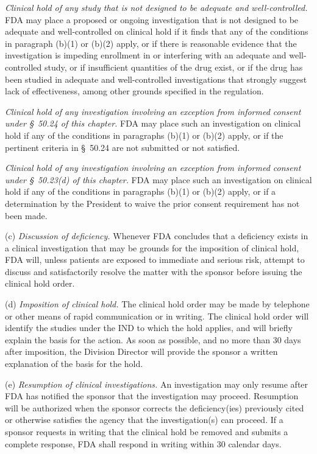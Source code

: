 \begin{description}[leftmargin=0.5cm,style=sameline]
\item[(4)] \textit{Clinical hold of any study that is not designed to be adequate and well-controlled.} FDA may place a proposed or ongoing investigation that is not designed to be adequate and well-controlled on clinical hold if it finds that any of the conditions in paragraph (b)(1) or (b)(2) apply, or if there is reasonable evidence that the investigation is impeding enrollment in or interfering with an adequate and well-controlled study, or if insufficient quantities of the drug exist, or if the drug has been studied in adequate and well-controlled investigations that strongly suggest lack of effectiveness, among other grounds specified in the regulation.

\item[(5)] \textit{Clinical hold of any investigation involving an exception from informed consent under \S~50.24 of this chapter.} FDA may place such an investigation on clinical hold if any of the conditions in paragraphs (b)(1) or (b)(2) apply, or if the pertinent criteria in \S~50.24 are not submitted or not satisfied.

\item[(6)] \textit{Clinical hold of any investigation involving an exception from informed consent under \S~50.23(d) of this chapter.} FDA may place such an investigation on clinical hold if any of the conditions in paragraphs (b)(1) or (b)(2) apply, or if a determination by the President to waive the prior consent requirement has not been made.
\end{description}

(c) \textit{Discussion of deficiency.} Whenever FDA concludes that a deficiency exists in a clinical investigation that may be grounds for the imposition of clinical hold, FDA will, unless patients are exposed to immediate and serious risk, attempt to discuss and satisfactorily resolve the matter with the sponsor before issuing the clinical hold order.

(d) \textit{Imposition of clinical hold.} The clinical hold order may be made by telephone or other means of rapid communication or in writing. The clinical hold order will identify the studies under the IND to which the hold applies, and will briefly explain the basis for the action. As soon as possible, and no more than 30 days after imposition, the Division Director will provide the sponsor a written explanation of the basis for the hold.

(e) \textit{Resumption of clinical investigations.} An investigation may only resume after FDA has notified the sponsor that the investigation may proceed. Resumption will be authorized when the sponsor corrects the deficiency(ies) previously cited or otherwise satisfies the agency that the investigation(s) can proceed. If a sponsor requests in writing that the clinical hold be removed and submits a complete response, FDA shall respond in writing within 30 calendar days.

